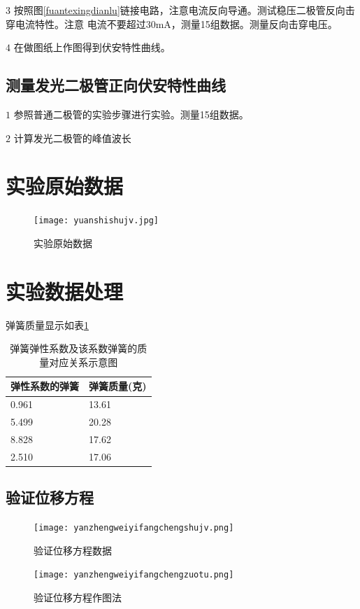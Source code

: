 \documentclass{ctexart}
\begin{document}
  \(3\) 按照图\ref{fuantexingdianlu}链接电路，注意电流反向导通。测试稳压二极管反向击穿电流特性。注意
        电流不要超过30mA，测量15组数据。测量反向击穿电压。

  \(4\) 在做图纸上作图得到伏安特性曲线。

  \subsection{测量发光二极管正向伏安特性曲线}
  \(1\) 参照普通二极管的实验步骤进行实验。测量15组数据。

  \(2\) 计算发光二极管的峰值波长

  \subsection{}
\newpage







\section{实验原始数据}
\begin{figure}[h]
  \centering
  \texttt{[image: yuanshishujv.jpg]}
  \caption{实验原始数据}\label{yuanshishujv}
\end{figure}
\newpage
\section{实验数据处理}
弹簧质量显示如表\ref{tanhuangzhiliang}
\begin{table}[h]
  \centering   
  \caption{弹簧弹性系数及该系数弹簧的质量对应关系示意图}\label{tanhuangzhiliang}
  \begin{tabular}{| l || l |}
      \hline
      弹性系数的弹簧 & 弹簧质量(克)\\
      \hline
      0.961 & 13.61 \\
      \hline
      5.499 & 20.28 \\
      \hline
      8.828 & 17.62 \\
      \hline
      2.510 & 17.06 \\
      \hline                       
  \end{tabular}
\end{table}
  \subsection{验证位移方程}
  \begin{figure}[b]
    \centering
    \begin{minipage}[b]{0.48\textwidth}
      \centering
      \texttt{[image: yanzhengweiyifangchengshujv.png]}
      \caption{验证位移方程数据}\label{yanzhengweiyifangchengshujv}
    \end{minipage}
    \begin{minipage}[b]{0.48\textwidth}
      \centering
      \texttt{[image: yanzhengweiyifangchengzuotu.png]}
      \caption{验证位移方程作图法}\label{yanzhengweiyifangchengzuotu}
    \end{minipage}
  \end{figure}
\end{document}
